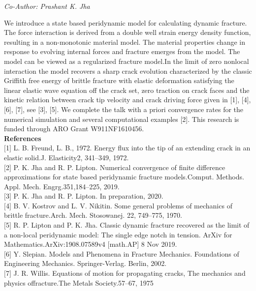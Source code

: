 \begin{center}
\textit{Co-Author: Prashant K. Jha}
\end{center} 
We introduce a state based peridynamic model for calculating dynamic fracture. The force interaction is derived from a double well strain energy density function, resulting in a non-monotonic material model. The material properties change in response to evolving internal forces and fracture emerges from the model. The model can be viewed as a regularized fracture model.In the limit of zero nonlocal interaction the model recovers a sharp crack evolution characterized by the classic Griffith free energy of brittle fracture with elastic deformation satisfying the linear elastic wave equation off the crack set, zero traction on crack faces and the kinetic relation between crack tip velocity and crack driving force given in [1], [4], [6], [7], see [3], [5]. We complete the talk with a priori convergence rates for the numerical simulation and several computational examples [2]. This research is funded through ARO Grant W911NF1610456.\\

\noindent\textbf{References}\\
$[$1$]$ L. B. Freund, L. B., 1972. Energy flux into the tip of an extending crack in an elastic solid.J. Elasticity2, 341–349, 1972. \\\newline
$[$2$]$ P. K. Jha and R. P. Lipton. Numerical convergence of finite difference approximations for state based peridynamic fracture models.Comput. Methods. Appl. Mech. Engrg.351,184–225, 2019. \\\newline
$[$3$]$ P. K. Jha and R. P. Lipton. In preparation, 2020.\\\newline
$[$4$]$ B. V. Kostrov and L. V. Nikitin. Some general problems of mechanics of brittle fracture.Arch. Mech. Stosowanej. 22, 749–775, 1970.\\\newline
$[$5$]$ R. P. Lipton and P. K. Jha. Classic dynamic fracture recovered as the limit of a non-local peridynamic model: The single edge notch in tension. ArXiv for Mathematics.ArXiv:1908.07589v4 [math.AP] 8 Nov 2019.\\\newline
$[$6$]$ Y. Slepian. Models and Phenomena in Fracture Mechanics. Foundations of Engineering Mechanics. Springer-Verlag. Berlin, 2002. \\\newline
$[$7$]$ J. R. Willis. Equations of motion for propagating cracks, The mechanics and physics offracture.The Metals Society.57–67, 1975
